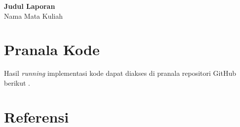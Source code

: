 \documentclass[12pt, a4paper, bahasa]{article}
\begin{document}
\begin{center}
    \large \textbf{Judul Laporan} \\[0.2cm]
    \large Nama Mata Kuliah  \\[0.5cm]
\end{center}


\section{Pranala Kode}
Hasil \textit{running} implementasi kode dapat diakses di pranala repositori GitHub berikut \url{} \cite{klir_fuzzy_1995}.

\section{Referensi}
\printbibliography[heading=none]
\end{document}

